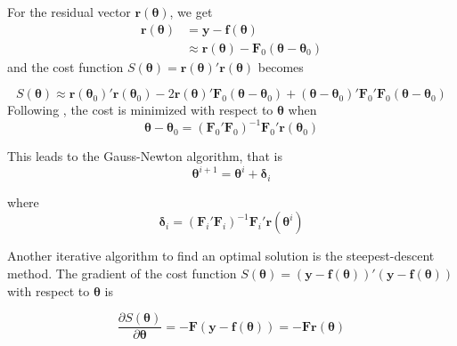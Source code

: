 For the residual vector $\mathbf{r}(\boldsymbol{\theta})$, we get
\begin{align}
\mathbf{r}(\boldsymbol{\theta}) 
&= \mathbf{y} - \mathbf{f}(\boldsymbol{\theta}) \nonumber\\
&\approx \mathbf{r}(\boldsymbol{\theta}) - \mathbf{F}_0(\boldsymbol{\theta} - \boldsymbol{\theta}_0)
\end{align}
and the cost function 
$S(\boldsymbol{\theta}) = \mathbf{r}(\boldsymbol{\theta})' \mathbf{r}(\boldsymbol{\theta})$
becomes

\begin{equation}
S(\boldsymbol{\theta}) \approx
\mathbf{r}(\boldsymbol{\theta}_0)' \mathbf{r}(\boldsymbol{\theta}_0) -
2 \mathbf{r}(\boldsymbol{\theta}) ' \mathbf{F}_0(\boldsymbol{\theta} - \boldsymbol{\theta}_0) + 
(\boldsymbol{\theta} - \boldsymbol{\theta}_0)'
\mathbf{F}_0' \mathbf{F}_0
(\boldsymbol{\theta} - \boldsymbol{\theta}_0)
\end{equation}
Following \citet[chap. 2]{Seber}, the cost is minimized with respect to $\boldsymbol{\theta}$ when
\begin{equation}
\boldsymbol{\theta} - \boldsymbol{\theta}_0 = 
(\mathbf{F}_0' \mathbf{F}_0)^{-1} \mathbf{F}_0' \mathbf{r}(\boldsymbol{\theta}_0)
\end{equation}

This leads to the Gauss-Newton algorithm, that is
\begin{equation}
\boldsymbol{\theta}^{i+1} =
\boldsymbol{\theta}^{i} + \boldsymbol{\delta}_i
\end{equation}

where
\begin{equation}
\label{eq:gauss_newton_step}
\boldsymbol{\delta}_i = (\mathbf{F}_i' \mathbf{F}_i)^{-1} \mathbf{F}_i' \mathbf{r}(\boldsymbol{\theta}^{i})
\end{equation}

Another iterative algorithm to find an optimal solution is the steepest-descent method.
The gradient of the cost function 
$S(\boldsymbol{\theta}) = ( \mathbf{y} - \mathbf{f}(\boldsymbol{\theta}) )'
( \mathbf{y} - \mathbf{f}(\boldsymbol{\theta}) )$
with respect to $\boldsymbol{\theta}$ is

\begin{equation}
\frac{\partial S(\boldsymbol{\theta})}{\partial \boldsymbol{\theta}} = 
- \mathbf{F} ( \mathbf{y} - \mathbf{f}(\boldsymbol{\theta}) ) = 
- \mathbf{F}  \mathbf{r}(\boldsymbol{\theta}) 
\end{equation}

